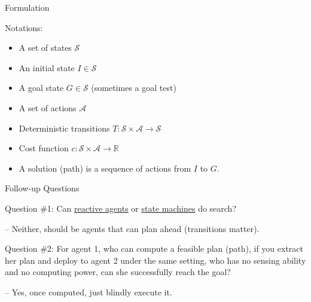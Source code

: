 \documentclass{beamer}
\begin{document}
\begin{frame}{Formulation}
    \begin{exampleblock}{Notations:}
        \begin{itemize}
            \item A set of states $\mathcal{S}$

            \item An initial state $I \in \mathcal{S}$

            \item A goal state $G \in \mathcal{S}$ (sometimes a goal test)

            \item A set of actions $\mathcal{A}$

            \item Deterministic transitions $T: \mathcal{S} \times \mathcal{A} \rightarrow \mathcal{S}$

            \item Cost function $c: \mathcal{S} \times \mathcal{A} \rightarrow \mathbb{R}$

            \item \alert{A solution (path) is a sequence of actions from $I$ to $G$.}
        \end{itemize}
    \end{exampleblock}

\end{frame}

\begin{frame}{Follow-up Questions}
    \begin{exampleblock}{Question \#1:}
        Can \underline{reactive agents} or \underline{state machines} do search?

        \pause -- Neither, should be agents that can plan ahead (transitions matter).
    \end{exampleblock}

    \pause
    \begin{exampleblock}{Question \#2:}
        For agent 1, who can compute a feasible plan (path), if you extract her plan
        and deploy to agent 2 under the same setting, who has no sensing ability and no
        computing power, can she successfully reach the goal?

        \pause -- Yes, once computed, just blindly execute it.
    \end{exampleblock}
    
\end{frame}
\end{document}
